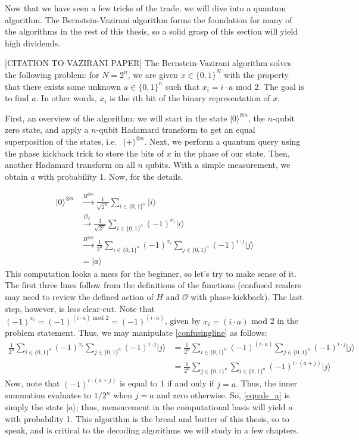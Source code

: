 \documentclass[12pt,twoside]{reedthesis}
\newcommand{\ketz}{\ensuremath{\lvert 0\rangle}\xspace}
\newcommand{\ket}[1]{\ensuremath{\lvert #1\rangle}\xspace}
\newcommand{\Hplus}{\ensuremath{\lvert + \rangle}\xspace}
\begin{document}
Now that we have seen a few tricks of the trade, we will dive into a quantum algorithm. The Bernstein-Vazirani algorithm forms the foundation for many of the algorithms in the rest of this thesis, so a solid grasp of this section will yield high dividends. 

[CITATION TO VAZIRANI PAPER] The Bernstein-Vazirani algorithm solves the following problem: for $N = 2^n$, we are given $x \in \{0,1\}^N$ with the property that there exists some unknown $a \in \{0,1\}^n$ such that $x_i = i \cdot a$ mod 2. The goal is to find $a$. In other words, $x_i$ is the $i$th bit of the binary representation of $x$. 

First, an overview of the algorithm: we will start in the state $\ketz^{\otimes n}$, the $n$-qubit zero state, and apply a $n$-qubit Hadamard transform to get an equal superposition of the states, i.e.~ $\Hplus^{\otimes n}$. Next, we perform a quantum query using the phase kickback trick to store the bits of $x$ in the phase of our state. Then, another Hadamard transform on all $n$ qubits. With a simple measurement, we obtain $a$ with probability 1. Now, for the details.

\begin{align}
 \ketz^{\otimes n}
& \xrightarrow{H^{\otimes n}}\frac{1}{\sqrt{2^n}} \sum_{i \in \{0,1\}^n} \ket{i} \\
& \xrightarrow{\mathcal{O}_x} \frac{1}{\sqrt{2^n}} \sum_{i \in \{0,1\}^n} (-1)^{x_i}\ket{i}\\
& \xrightarrow{H^{\otimes n}} \frac{1}{2^n} \sum_{i \in \{0,1\}^n} (-1)^{x_i} \sum_{j \in \{0,1\}^n} (-1)^{i \cdot j} \ket{j} \label{confusingline}\\
& = \ket{a}
\end{align}
This computation looks a mess for the beginner, so let's try to make sense of it. The first three lines follow from the definitions of the functions (confused readers may need to review the defined action of $H$ and $\mathcal{O}$ with phase-kickback). The last step, however, is less clear-cut. Note that $(-1)^{x_i} = (-1)^{(i \cdot a) \text{ mod } 2} = (-1)^{(i \cdot a)}$, given by $x_i = (i \cdot a)$ mod 2 in the problem statement. Thus, we may manipulate \ref{confusingline} as follows:
\begin{align}
 \frac{1}{2^n} \sum_{i \in \{0,1\}^n} (-1)^{x_i} \sum_{j \in \{0,1\}^n} (-1)^{i \cdot j} \ket{j}
& = \frac{1}{2^n} \sum_{i \in \{0,1\}^n} (-1)^{(i \cdot a)} \sum_{j \in \{0,1\}^n} (-1)^{i \cdot j} \ket{j} \\
& = \frac{1}{2^n}  \sum_{j \in \{0,1\}^n}\sum_{i \in \{0,1\}^n} (-1)^{i \cdot(a + j)}  \ket{j} \label{equals_a}
\end{align}
Now, note that $(-1)^{i \cdot(a + j)}$ is equal to 1 if and only if $j = a$. Thus, the inner summation evaluates to $1/2^n$ when $j =a$ and zero otherwise. So, \ref{equals_a} is simply the state $\ket{a}$; thus, measurement in the computational basis will yield $a$ with probability 1. This algorithm is the bread and butter of this thesis, so to speak, and is critical to the decoding algorithms we will study in a few chapters. 
\end{document}
